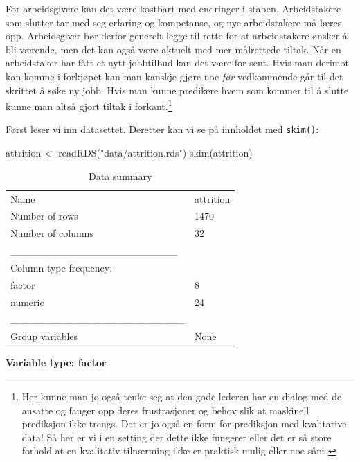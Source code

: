 \documentclass[
  letterpaper,
  DIV=11,
  numbers=noendperiod]{scrreprt}
\newenvironment{Shaded}{\begin{snugshade}}{\end{snugshade}}
\newcommand{\FunctionTok}[1]{\textcolor[rgb]{0.28,0.35,0.67}{#1}}
\newcommand{\NormalTok}[1]{\textcolor[rgb]{0.00,0.23,0.31}{#1}}
\newcommand{\OtherTok}[1]{\textcolor[rgb]{0.00,0.23,0.31}{#1}}
\newcommand{\StringTok}[1]{\textcolor[rgb]{0.13,0.47,0.30}{#1}}
\begin{document}
For arbeidsgivere kan det være kostbart med endringer i staben.
Arbeidstakere som slutter tar med seg erfaring og kompetanse, og nye
arbeidstakere må læres opp. Arbeidsgiver bør derfor generelt legge til
rette for at arbeidstakere ønsker å bli værende, men det kan også være
aktuelt med mer målrettede tiltak. Når en arbeidstaker har fått et nytt
jobbtilbud kan det være for sent. Hvis man derimot kan komme i forkjøpet
kan man kanskje gjøre noe \emph{før} vedkommende går til det skrittet å
søke ny jobb. Hvis man kunne predikere hvem som kommer til å slutte
kunne man altså gjort tiltak i forkant.\footnote{Her kunne man jo også
  tenke seg at den gode lederen har en dialog med de ansatte og fanger
  opp deres frustrasjoner og behov slik at maskinell prediksjon ikke
  trengs. Det er jo også en form for prediksjon med kvalitative data! Så
  her er vi i en setting der dette ikke fungerer eller det er så store
  forhold at en kvalitativ tilnærming ikke er praktisk mulig eller noe
  sånt.}

Først leser vi inn datasettet. Deretter kan vi se på innholdet med
\texttt{skim()}:

\begin{Shaded}
\begin{Highlighting}[]
\NormalTok{attrition }\OtherTok{\textless{}{-}} \FunctionTok{readRDS}\NormalTok{(}\StringTok{"data/attrition.rds"}\NormalTok{)}
\FunctionTok{skim}\NormalTok{(attrition)}
\end{Highlighting}
\end{Shaded}

\begin{longtable}[]{@{}ll@{}}
\caption{Data summary}\tabularnewline
\toprule\noalign{}
\endfirsthead
\endhead
\bottomrule\noalign{}
\endlastfoot
Name & attrition \\
Number of rows & 1470 \\
Number of columns & 32 \\
\_\_\_\_\_\_\_\_\_\_\_\_\_\_\_\_\_\_\_\_\_\_\_ & \\
Column type frequency: & \\
factor & 8 \\
numeric & 24 \\
\_\_\_\_\_\_\_\_\_\_\_\_\_\_\_\_\_\_\_\_\_\_\_\_ & \\
Group variables & None \\
\end{longtable}

\textbf{Variable type: factor}
\end{document}
